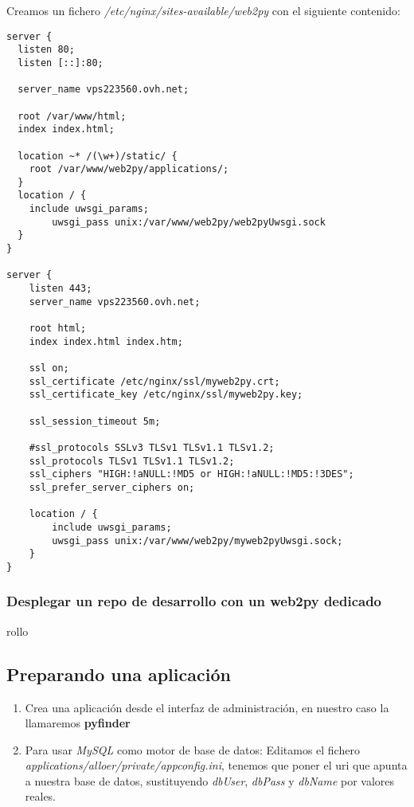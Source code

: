 \documentclass[12pt,spanish,]{article}
\begin{document}
Creamos un fichero \emph{/etc/nginx/sites-available/web2py} con el
siguiente contenido:

\begin{verbatim}
server {
  listen 80;
  listen [::]:80;

  server_name vps223560.ovh.net;

  root /var/www/html;
  index index.html;

  location ~* /(\w+)/static/ {
    root /var/www/web2py/applications/;
  }
  location / {
    include uwsgi_params;
        uwsgi_pass unix:/var/www/web2py/web2pyUwsgi.sock
  }
}

server {
    listen 443;
    server_name vps223560.ovh.net;

    root html;
    index index.html index.htm;

    ssl on;
    ssl_certificate /etc/nginx/ssl/myweb2py.crt;
    ssl_certificate_key /etc/nginx/ssl/myweb2py.key;

    ssl_session_timeout 5m;

    #ssl_protocols SSLv3 TLSv1 TLSv1.1 TLSv1.2;
    ssl_protocols TLSv1 TLSv1.1 TLSv1.2;
    ssl_ciphers "HIGH:!aNULL:!MD5 or HIGH:!aNULL:!MD5:!3DES";
    ssl_prefer_server_ciphers on;

    location / {
        include uwsgi_params;
        uwsgi_pass unix:/var/www/web2py/myweb2pyUwsgi.sock;
    }
}
\end{verbatim}

\hypertarget{desplegar-un-repo-de-desarrollo-con-un-web2py-dedicado}{%
\subsubsection{Desplegar un repo de desarrollo con un web2py
dedicado}\label{desplegar-un-repo-de-desarrollo-con-un-web2py-dedicado}}

rollo

\hypertarget{preparando-una-aplicaciuxf3n}{%
\subsection{Preparando una
aplicación}\label{preparando-una-aplicaciuxf3n}}

\begin{enumerate}
\def\labelenumi{\arabic{enumi}.}
\item
  Crea una aplicación desde el interfaz de administración, en nuestro
  caso la llamaremos \textbf{pyfinder}
\item
  Para usar \emph{MySQL} como motor de base de datos: Editamos el
  fichero \emph{applications/alloer/private/appconfig.ini}, tenemos que
  poner el uri que apunta a nuestra base de datos, sustituyendo
  \emph{dbUser}, \emph{dbPass} y \emph{dbName} por valores reales.
\end{enumerate}
\end{document}
